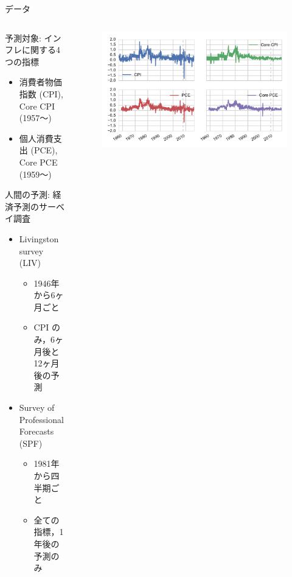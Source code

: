 \documentclass[dvipdfmx,aspectratio=169]{beamer}
\begin{document}
\begin{frame}{データ}
\begin{columns}
  \begin{column}{0.6\textwidth}
    \begin{block}{予測対象: インフレに関する4つの指標}
      \begin{itemize}
        \item 消費者物価指数 (CPI), Core CPI (1957〜)
        \item 個人消費支出 (PCE), Core PCE (1959〜)
      \end{itemize}
    \end{block}
    \begin{block}{人間の予測: 経済予測のサーベイ調査}
      \begin{itemize}
        \item Livingston survey (LIV)
        \begin{itemize}
          \item 1946年から6ヶ月ごと
          \item CPI のみ，6ヶ月後と12ヶ月後の予測
        \end{itemize}
        \item Survey of Professional Forecasts (SPF)
        \begin{itemize}
          \item 1981年から四半期ごと
          \item 全ての指標，1年後の予測のみ
        \end{itemize}
      \end{itemize}
    \end{block}
  \end{column}
  \begin{column}{0.4\textwidth}
    \begin{figure}
      \centering
      \includegraphics[width=\columnwidth]{slide-series.pdf}\\

\end{figure}
\end{column}
\end{columns}
\end{frame}
\end{document}
